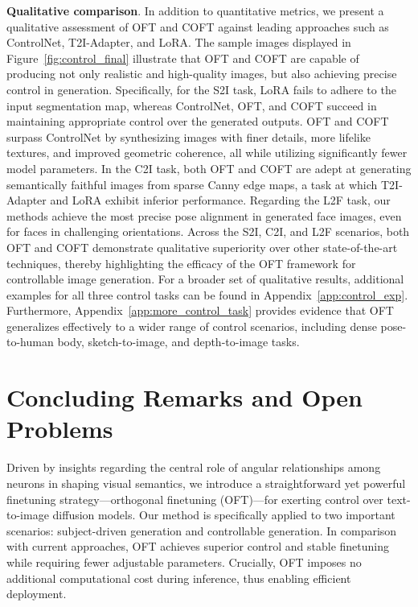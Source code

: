 {\textbf{Qualitative comparison}. In addition to quantitative metrics, we present a qualitative assessment of OFT and COFT against leading approaches such as ControlNet, T2I-Adapter, and LoRA. The sample images displayed in Figure~\ref{fig:control_final} illustrate that OFT and COFT are capable of producing not only realistic and high-quality images, but also achieving precise control in generation. Specifically, for the S2I task, LoRA fails to adhere to the input segmentation map, whereas ControlNet, OFT, and COFT succeed in maintaining appropriate control over the generated outputs. OFT and COFT surpass ControlNet by synthesizing images with finer details, more lifelike textures, and improved geometric coherence, all while utilizing significantly fewer model parameters. In the C2I task, both OFT and COFT are adept at generating semantically faithful images from sparse Canny edge maps, a task at which T2I-Adapter and LoRA exhibit inferior performance. Regarding the L2F task, our methods achieve the most precise pose alignment in generated face images, even for faces in challenging orientations. Across the S2I, C2I, and L2F scenarios, both OFT and COFT demonstrate qualitative superiority over other state-of-the-art techniques, thereby highlighting the efficacy of the OFT framework for controllable image generation. For a broader set of qualitative results, additional examples for all three control tasks can be found in Appendix~\ref{app:control_exp}. Furthermore, Appendix~\ref{app:more_control_task} provides evidence that OFT generalizes effectively to a wider range of control scenarios, including dense pose-to-human body, sketch-to-image, and depth-to-image tasks.

\section{Concluding Remarks and Open Problems}

Driven by insights regarding the central role of angular relationships among neurons in shaping visual semantics, we introduce a straightforward yet powerful finetuning strategy—orthogonal finetuning (OFT)—for exerting control over text-to-image diffusion models. Our method is specifically applied to two important scenarios: subject-driven generation and controllable generation. In comparison with current approaches, OFT achieves superior control and stable finetuning while requiring fewer adjustable parameters. Crucially, OFT imposes no additional computational cost during inference, thus enabling efficient deployment.

}
